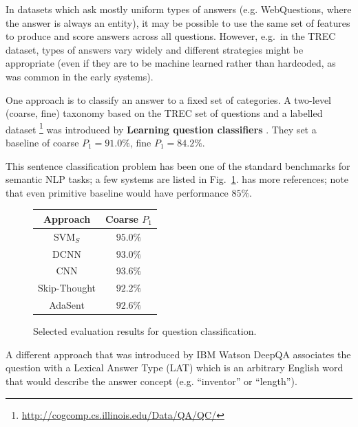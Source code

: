 In datasets which ask mostly uniform types of answers (e.g. WebQuestions,
where the answer is always an entity), it may be possible to use the same
set of features to produce and score answers across all questions.
However, e.g.\ in the TREC dataset, types of answers vary widely and
different strategies might be appropriate (even if they are to be machine
learned rather than hardcoded, as was common in the early systems).

One approach is to classify an answer to a fixed set of categories.
A two-level (coarse, fine) taxonomy based on the TREC set of questions and a labelled dataset%
\footnote{\url{http://cogcomp.cs.illinois.edu/Data/QA/QC/}}
was introduced by \textbf{Learning question classifiers} \citep{QCLearning}.
They set a baseline of coarse $P_1=91.0\%$, fine $P_1=84.2\%$.

This sentence classification problem has been one of the standard benchmarks
for semantic NLP tasks; a few systems are listed in Fig.~\ref{fig:qcbench}.
\citep{AdaSent} has more references; note that even primitive baseline would have performance $85\%$.


\begin{figure}[t]
\centering
\begin{tabular}{|c|c|}
\hline
Approach & Coarse $P_1$ \\
\hline
SVM$_S$ \citep{QCSilvaSVM} & $95.0\%$ \\
DCNN \citep{QtcDCNN} & $93.0\%$ \\
CNN \citep{CNNSentClass} & $93.6\%$ \\
Skip-Thought \citep{SkipThought} & $92.2\%$ \\ %
AdaSent \citep{AdaSent} & $92.6\%$ \\
\hline
\end{tabular}
\vspace*{-0.2cm}
\caption{Selected evaluation results for question classification.}
\label{fig:qcbench}
\end{figure}

A different approach that was introduced by IBM Watson DeepQA \citep{WatsonTyCor}
associates the question with a Lexical Answer Type (LAT) which is
an arbitrary English word that would describe the answer concept
(e.g. ``inventor'' or ``length'').

